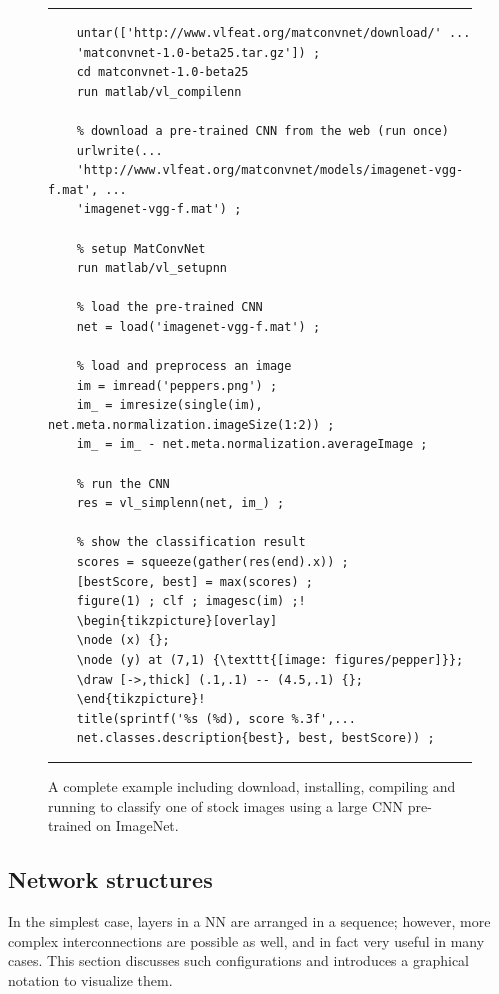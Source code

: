 \begin{figure}
	\hrule
	\begin{lstlisting}[escapechar=!]
	% install and compile MatConvNet (run once)
	untar(['http://www.vlfeat.org/matconvnet/download/' ...
	'matconvnet-1.0-beta25.tar.gz']) ;
	cd matconvnet-1.0-beta25
	run matlab/vl_compilenn
	
	% download a pre-trained CNN from the web (run once)
	urlwrite(...
	'http://www.vlfeat.org/matconvnet/models/imagenet-vgg-f.mat', ...
	'imagenet-vgg-f.mat') ;
	
	% setup MatConvNet
	run matlab/vl_setupnn
	
	% load the pre-trained CNN
	net = load('imagenet-vgg-f.mat') ;
	
	% load and preprocess an image
	im = imread('peppers.png') ;
	im_ = imresize(single(im), net.meta.normalization.imageSize(1:2)) ;
	im_ = im_ - net.meta.normalization.averageImage ;
	
	% run the CNN
	res = vl_simplenn(net, im_) ;
	
	% show the classification result
	scores = squeeze(gather(res(end).x)) ;
	[bestScore, best] = max(scores) ;
	figure(1) ; clf ; imagesc(im) ;!
	\begin{tikzpicture}[overlay]
	\node (x) {};
	\node (y) at (7,1) {\texttt{[image: figures/pepper]}};
	\draw [->,thick] (.1,.1) -- (4.5,.1) {};
	\end{tikzpicture}!
	title(sprintf('%s (%d), score %.3f',...
	net.classes.description{best}, best, bestScore)) ;
	\end{lstlisting}
	\hrule
	\caption{A complete example including download, installing, compiling and running  \matconvnet to classify one of  \matlab stock images using a large CNN pre-trained on ImageNet.}
	\label{f:demo}
\end{figure}

\subsection{Network structures}\label{s:cnn-topology}

In the simplest case, layers in a NN are arranged in a sequence; however, more complex interconnections are possible as well, and in fact very useful in many cases. This section discusses such configurations and introduces a graphical notation to visualize them.

